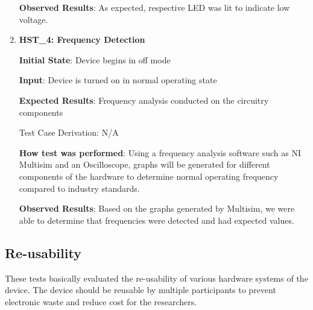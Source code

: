 \documentclass[12pt, titlepage]{article}
\begin{document}
\begin{enumerate}
  \textbf{Observed Results}: As expected, respective LED was lit to indicate low voltage.

  \item{\textbf{HST\_4: Frequency Detection}}\label{HST4}

  \textbf{Initial State}: Device begins in off mode

  \textbf{Input}: Device is turned on in normal operating state

  \textbf{Expected Results}: Frequency analysis conducted on the circuitry components

  Test Case Derivation: N/A

  \textbf{How test was performed}: Using a frequency analysis software such as NI Multisim and an Oscilloscope, graphs will be generated for different components of the hardware to determine normal operating frequency compared to industry standards.

  \textbf{Observed Results}: Based on the graphs generated by Multisim, we were able to determine that frequencies were detected and had expected values.

\end{enumerate}

\subsection{Re-usability}

These tests basically evaluated the re-usability of various hardware systems of the device. The device should be reusable by multiple participants to prevent electronic waste and reduce cost for the researchers.
\end{document}
